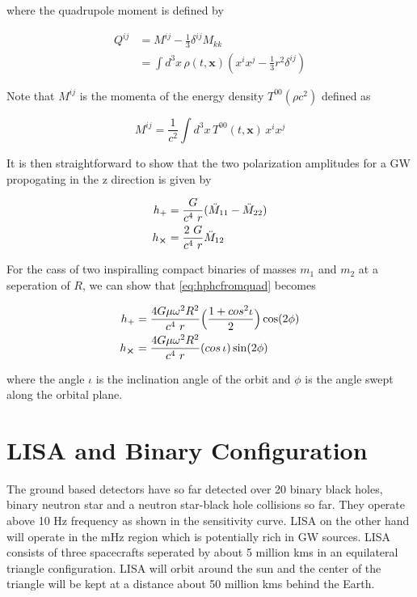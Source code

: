 \documentclass[12pt,a4paper,oneside]{book}
\begin{document}
where the quadrupole moment is defined by 

\begin{align}
Q^{ij} &= M^{ij} - \frac{1}{3} \delta^{ij} M_{kk} \\
       &= \int d^3 x \, \rho(t,\textbf{x}) (x^i x^j - \frac{1}{3} r^2 \delta^{ij})
\end{align}

Note that $M^{ij}$ is the momenta of the energy density $T^{00} (\rho c^2)$ defined as

\begin{equation}
M^{ij} = \frac{1}{c^2} \int d^3 x  \, T^{00}(t,\textbf{x}) \, x^i x^j 
\end{equation}

It is then straightforward to show that the two polarization amplitudes for a GW propogating in the z direction is given by

\begin{align}
\label{eq:hphcfromquad}
h_{+} &= \frac{G}{c^4 \ r} (\ddot{M}_{11} - \ddot{M}_{22})\\
h_{\cross} &= \frac{2 \ G}{c^4 \ r} \ddot{M}_{12}
\end{align}

For the cass of two inspiralling compact binaries of masses $m_1$ and $m_2$ at a seperation of $R$, we can show that \eqref{eq:hphcfromquad} becomes

\begin{align}
\label{eq:hphcfrombinary}
h_{+} &= \frac{4 G \mu \omega^2 R^2}{c^4 \ r} \Bigl(\frac{1 + cos^2 \iota}{2}\Bigr) \cos(2 \phi) \\
h_{\cross} &= \frac{4 G \mu \omega^2 R^2}{c^4 \ r} (cos \, \iota) \sin(2 \phi)
\end{align}

where the angle $\iota$ is the inclination angle of the orbit and $\phi$ is the angle swept along the orbital plane.


\section*{LISA and Binary Configuration}

The ground based detectors have so far detected over 20 binary black holes, binary neutron star and a neutron star-black hole collisions so far. They operate above 10 Hz frequency as shown in the sensitivity curve. LISA on the other hand will operate in the mHz region which is potentially rich in GW sources. LISA consists of three spacecrafts seperated by about 5 million kms in an equilateral triangle configuration. LISA will orbit around the sun and the center of the triangle will be kept at a distance about 50 million kms behind the Earth. 
\end{document}
